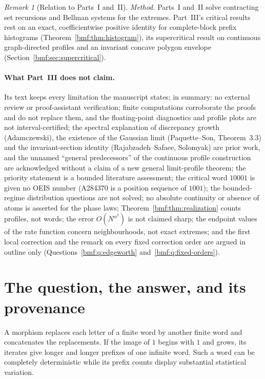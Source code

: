\documentclass[11pt]{article}
\numberwithin{equation}{section}
\theoremstyle{definition}
\theoremstyle{remark}
\newtheorem{remark}[theorem]{Remark}
\begin{document}
\begin{remark}[Relation to Parts~I and~II]
\emph{Method.} Parts~I and~II solve contracting set recursions and Bellman
systems for the extremes. Part~III's critical results rest on an exact,
coefficientwise positive identity for complete-block prefix histograms
(Theorem~\ref{bmf:thm:histogram}), its supercritical result on continuous
graph-directed profiles and an invariant concave polygon envelope
(Section~\ref{bmf:sec:supercritical}).
\end{remark}

\paragraph{What Part~III does not claim.} Its text keeps every limitation
the manuscript states; in summary: no external review or proof-assistant
verification; finite computations corroborate the proofs and do not replace
them, and the floating-point diagnostics and profile plots are not
interval-certified; the spectral explanation of discrepancy growth
(Adamczewski), the existence of the Gaussian limit (Paquette--Son,
Theorem~3.3) and the invariant-section identity (Rajabzadeh--Safaee,
Solomyak) are prior work, and the unnamed ``general predecessors'' of the
continuous profile construction are acknowledged without a claim of a new
general limit-profile theorem; the priority statement is a bounded
literature assessment; the critical word $10001$ is given no OEIS number
(A284370 is a position sequence of $1001$); the bounded-regime distribution
questions are not solved; no absolute continuity or absence of atoms is
asserted for the phase laws; Theorem~\ref{bmf:thm:realization} counts
profiles, not words; the error $O(N^{\alpha^2})$ is not claimed sharp; the
endpoint values of the rate function concern neighbourhoods, not exact
extremes; and the first local correction and the remark on every fixed
correction order are argued in outline only
(Questions~\ref{bmf:q:edgeworth} and~\ref{bmf:q:fixed-orders}).

\section{The question, the answer, and its provenance}\label{bmf:sec:intro}

A morphism replaces each letter of a finite word by another finite
word and concatenates the replacements. If the image of $1$ begins
with $1$ and grows, its iterates give longer and longer prefixes of
one infinite word. Such a word can be completely deterministic while
its prefix counts display substantial statistical variation.
\end{document}
